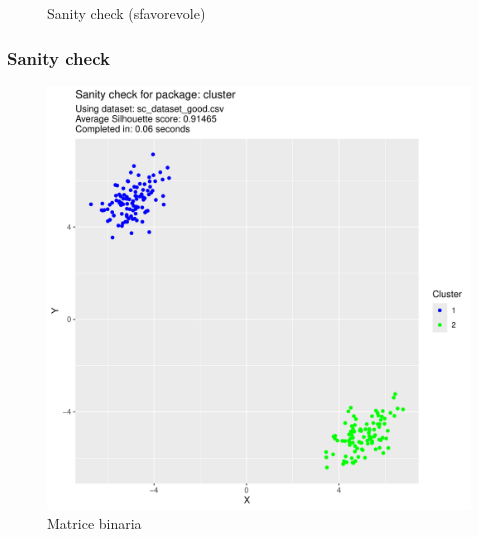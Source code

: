 \documentclass{beamer}
\begin{document}
\begin{frame}
\begin{boxedminipage}{0.49\textwidth}
\begin{figure}
                    \caption{Sanity check (sfavorevole)}
                \end{figure}
            \end{boxedminipage}
        \end{frame}

        \begin{frame}
            \frametitle{Sanity check}

            \centering
            \begin{boxedminipage}{0.49\textwidth}
                \begin{figure}
                    \includegraphics[width = \textwidth, page = 3]{results/results_CLUSTER.pdf}
                    \caption{Matrice binaria}
                \end{figure}
            \end{boxedminipage}
            \begin{boxedminipage}{0.49\textwidth}
                \begin{figure}

\end{figure}
\end{boxedminipage}
\end{frame}
\end{document}
